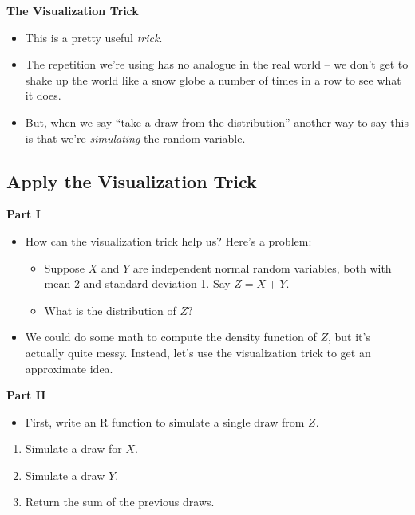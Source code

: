 \documentclass[
]{book}
\providecommand{\tightlist}{%
  \setlength{\itemsep}{0pt}\setlength{\parskip}{0pt}}
\theoremstyle{definition}
\theoremstyle{definition}
\theoremstyle{definition}
\theoremstyle{definition}
\theoremstyle{remark}
\begin{document}
\textbf{The Visualization Trick}

\begin{itemize}
\tightlist
\item
  This is a pretty useful \emph{trick}.\\
\item
  The repetition we're using has no analogue in the real world -- we don't get to shake up the world like a snow globe a number of times in a row to see what it does.
\item
  But, when we say ``take a draw from the distribution'' another way to say this is that we're \emph{simulating} the random variable.
\end{itemize}

\hypertarget{apply-the-visualization-trick}{%
\subsection{Apply the Visualization Trick}\label{apply-the-visualization-trick}}

\textbf{Part I}

\begin{itemize}
\item
  How can the visualization trick help us? Here's a problem:

  \begin{itemize}
  \tightlist
  \item
    Suppose \(X\) and \(Y\) are independent normal random variables, both with mean 2 and standard deviation 1. Say \(Z = X + Y\).\\
  \item
    What is the distribution of \(Z\)?
  \end{itemize}
\item
  We could do some math to compute the density function of \(Z\), but it's actually quite messy. Instead, let's use the visualization trick to get an approximate idea.
\end{itemize}

\textbf{Part II}

\begin{itemize}
\tightlist
\item
  First, write an R function to simulate a single draw from \(Z\).
\end{itemize}

\begin{enumerate}
\def\labelenumi{\arabic{enumi}.}
\tightlist
\item
  Simulate a draw for \(X\).
\item
  Simulate a draw \(Y\).
\item
  Return the sum of the previous draws.
\end{enumerate}
\end{document}
